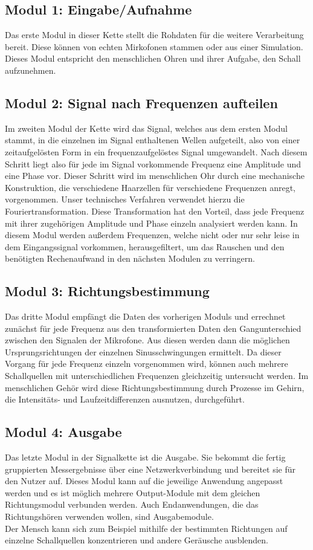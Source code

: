 \subsection{Modul 1: Eingabe/Aufnahme\label{sec:module1}}
Das erste Modul in dieser Kette stellt die Rohdaten für die weitere Verarbeitung bereit. Diese können von echten Mirkofonen stammen oder aus einer Simulation. Dieses Modul entspricht den menschlichen Ohren und ihrer Aufgabe, den Schall aufzunehmen.

\subsection{Modul 2: Signal nach Frequenzen aufteilen}
Im zweiten Modul der Kette wird das Signal, welches aus dem ersten Modul stammt, in die einzelnen im Signal enthaltenen Wellen aufgeteilt, also von einer zeitaufgelösten Form in ein frequenzaufgelöstes Signal umgewandelt. Nach diesem Schritt liegt also für jede im Signal vorkommende Frequenz eine Amplitude und eine Phase vor. Dieser Schritt wird im menschlichen Ohr durch eine mechanische Konstruktion, die verschiedene Haarzellen für verschiedene Frequenzen anregt, vorgenommen. Unser technisches Verfahren verwendet hierzu die Fouriertransformation. Diese Transformation hat den Vorteil, dass jede Frequenz mit ihrer zugehörigen Amplitude und Phase einzeln analysiert werden kann.
In diesem Modul werden außerdem Frequenzen, welche nicht oder nur sehr leise in dem Eingangssignal vorkommen, herausgefiltert, um das Rauschen und den benötigten Rechenaufwand in den nächsten Modulen zu verringern.

\subsection{Modul 3: Richtungsbestimmung}
Das dritte Modul empfängt die Daten des vorherigen Moduls und errechnet zunächst für jede Frequenz aus den transformierten Daten den Gangunterschied zwischen den Signalen der Mikrofone. Aus diesen werden dann die möglichen Ursprungsrichtungen der einzelnen Sinusschwingungen ermittelt. Da dieser Vorgang für jede Frequenz einzeln vorgenommen wird, können auch mehrere Schallquellen mit unterschiedlichen Frequenzen gleichzeitig untersucht werden. Im menschlichen Gehör wird diese Richtungsbestimmung durch Prozesse im Gehirn, die Intensitäts- und Laufzeitdifferenzen ausnutzen, durchgeführt.

\subsection{Modul 4: Ausgabe\label{sec:module4}}
Das letzte Modul in der Signalkette ist die Ausgabe. Sie bekommt die fertig gruppierten Messergebnisse über eine Netzwerkverbindung und bereitet sie für den Nutzer auf. Dieses Modul kann auf die jeweilige Anwendung angepasst werden und es ist möglich mehrere Output-Module mit dem gleichen Richtungsmodul verbunden werden. Auch Endanwendungen, die das Richtungshören verwenden wollen, sind Ausgabemodule.\\
Der Mensch kann sich zum Beispiel mithilfe der bestimmten Richtungen auf einzelne Schallquellen konzentrieren und andere Geräusche ausblenden.